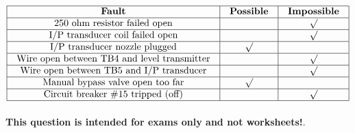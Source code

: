 






$$\vbox{\offinterlineskip
\halign{\strut
\vrule \quad\hfil # \ \hfil & 
\vrule \quad\hfil # \ \hfil & 
\vrule \quad\hfil # \ \hfil \vrule \cr
\noalign{\hrule}
%
{\bf Fault} & {\bf Possible} & {\bf Impossible} \cr
%
\noalign{\hrule}
%
250 ohm resistor failed open &  & $\surd$ \cr
%
\noalign{\hrule}
%
I/P transducer coil failed open &  & $\surd$ \cr
%
\noalign{\hrule}
%
I/P transducer nozzle plugged & $\surd$ &  \cr
%
\noalign{\hrule}
%
Wire open between TB4 and level transmitter &  & $\surd$ \cr
%
\noalign{\hrule}
%
Wire open between TB5 and I/P transducer &  & $\surd$ \cr
%
\noalign{\hrule}
%
Manual bypass valve open too far & $\surd$ &  \cr
%
\noalign{\hrule}
%
Circuit breaker \#15 tripped (off) &  & $\surd$ \cr
%
\noalign{\hrule}
} %
}$$ %







{\bf This question is intended for exams only and not worksheets!}.



